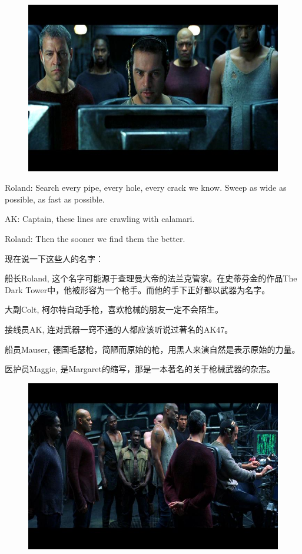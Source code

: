 \documentclass[UTF8]{ctexart}
\newenvironment{myquote}{\color{green} \setlength{\leftskip}{6em} \setlength{\rightskip}{4em} \setlength{\parindent}{-2em}}{\par}
\begin{document}
\begin{figure}[htb]
\centering
\includegraphics[width=0.5\linewidth]{fig/17e9a71eb5c1f41f41341710.jpg}
\end{figure}

\begin{myquote}
Roland: Search every pipe, every hole, every crack we know. Sweep as wide as possible, as fast as possible.

AK: Captain, these lines are crawling with calamari.

Roland: Then the sooner we find them the better.
\end{myquote}

现在说一下这些人的名字：

船长Roland, 这个名字可能源于查理曼大帝的法兰克管家。在史蒂芬金的作品The Dark Tower中，他被形容为一个枪手。而他的手下正好都以武器为名字。

大副Colt, 柯尔特自动手枪，喜欢枪械的朋友一定不会陌生。

接线员AK, 连对武器一窍不通的人都应该听说过著名的AK47。

船员Mauser, 德国毛瑟枪，简陋而原始的枪，用黑人来演自然是表示原始的力量。

医护员Maggie, 是Margaret的缩写，那是一本著名的关于枪械武器的杂志。

\begin{figure}[htb]
\centering
\includegraphics[width=0.5\linewidth]{fig/84bda8ec1f006a2762d09f12.jpg}
\end{figure}
\end{document}
